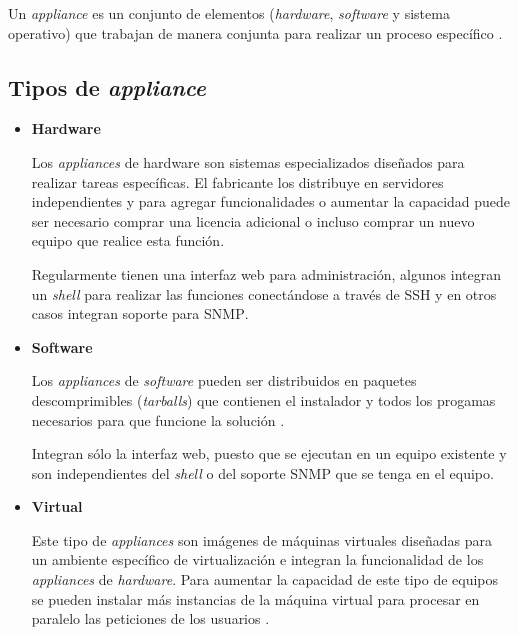 Un \textit{appliance} es un conjunto de elementos (\textit{hardware}, \textit{software} y sistema operativo) que trabajan de manera conjunta para realizar un proceso espec\'{i}fico \cite{smith_linux_2007}.

    \subsection{Tipos de \textit{appliance}}

\begin{itemize}

  \item \textbf{Hardware}

Los \textit{appliances} de hardware son sistemas especializados dise\~{n}ados para realizar tareas espec\'{i}ficas. El fabricante los distribuye en servidores independientes y para agregar funcionalidades o aumentar la capacidad puede ser necesario comprar una licencia adicional o incluso comprar un nuevo equipo que realice esta funci\'{o}n.

Regularmente tienen una interfaz web para administraci\'{o}n, algunos integran un \textit{shell} para realizar las funciones conect\'{a}ndose a trav\'{e}s de \textsc{SSH} y en otros casos integran soporte para \textsc{SNMP}.

\newpage
  \item \textbf{Software}

Los \textit{appliances} de \textit{software} pueden ser distribuidos en paquetes descomprimibles (\textit{tarballs}) que contienen el instalador y todos los progamas necesarios para que funcione la soluci\'{o}n \cite{_bitnami:_????}.

Integran s\'{o}lo la interfaz web, puesto que se ejecutan en un equipo existente y son independientes del \textit{shell} o del soporte \textsc{SNMP} que se tenga en el equipo.

  \item \textbf{Virtual}

Este tipo de \textit{appliances} son im\'{a}genes de m\'{a}quinas virtuales dise\~{n}adas para un ambiente espec\'{i}fico de virtualizaci\'{o}n e integran la funcionalidad de los \textit{appliances} de \textit{hardware}. Para aumentar la capacidad de este tipo de equipos se pueden instalar m\'{a}s instancias de la m\'{a}quina virtual para procesar en paralelo las peticiones de los usuarios \cite{_why_????}.

\end{itemize}

